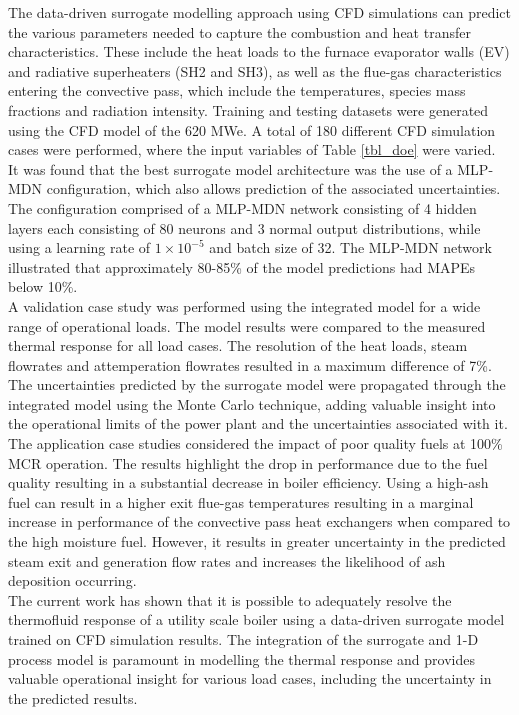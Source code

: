 \documentclass[a4paper,fleqn]{cas-dc}
\begin{document}
The data-driven surrogate modelling approach using CFD simulations can predict the various parameters needed to capture the combustion and heat transfer characteristics. These include the heat loads to the furnace evaporator walls (EV) and radiative superheaters (SH2 and SH3), as well as the flue-gas characteristics entering the convective pass, which include the temperatures, species mass fractions and radiation intensity. Training and testing datasets were generated using the CFD model of the 620 MWe. A total of 180 different CFD simulation cases were performed, where the input variables of Table \ref{tbl_doe} were varied.\\

It was found that the best surrogate model architecture was the use of a MLP-MDN configuration, which also allows prediction of the associated uncertainties. The configuration comprised of a MLP-MDN network consisting of 4 hidden layers each consisting of 80 neurons and 3 normal output distributions, while using a learning rate of $1\times10^{-5}$ and batch size of 32. The MLP-MDN network illustrated that approximately 80-85\% of the model predictions had MAPEs below 10\%.\\

A validation case study was performed using the integrated model for a wide range of operational loads. The model results were compared to the measured thermal response for all load cases. The resolution of the heat loads, steam flowrates and attemperation flowrates resulted in a maximum difference of 7\%. The uncertainties predicted by the surrogate model were propagated through the integrated model using the Monte Carlo technique, adding valuable insight into the operational limits of the power plant and the uncertainties associated with it.\\

The application case studies considered the impact of poor quality fuels at 100\% MCR operation. The results highlight the drop in performance due to the fuel quality resulting in a substantial decrease in boiler efficiency. Using a high-ash fuel can result in a higher exit flue-gas temperatures resulting in a marginal increase in performance of the convective pass heat exchangers when compared to the high moisture fuel. However, it results in greater uncertainty in the predicted steam exit and generation flow rates and increases the likelihood of ash deposition occurring.\\ 

The current work has shown that it is possible to adequately resolve the thermofluid response of a utility scale boiler using a data-driven surrogate model trained on CFD simulation results. The integration of the surrogate and 1-D process model is paramount in modelling the thermal response and provides valuable operational insight for various load cases, including the uncertainty in the predicted results.
\printcredits
%
%


\end{document}
